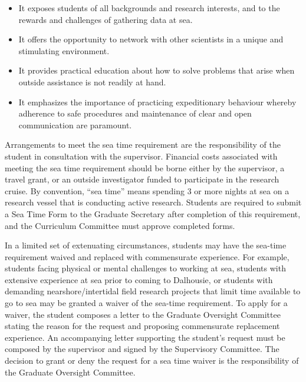 \documentclass[12pt]{article}
\newcommand{\di}[1]{#1}
\newcommand{\parnum}{\arabic{parcount}}
\newcounter{parcount}
\newcommand\p{\stepcounter{parcount}\leavevmode{\raisebox{0.2ex}{\scriptsize[\parnum]}}\hspace{0.2em}}
\newcommand{\supervisor}{supervisor\xspace}
\newcommand{\curcom}{Curriculum Committee\xspace}
\newcommand{\supcom}{Supervisory Committee\xspace}
\newcommand{\gocom}{Graduate Oversight Committee\xspace}
\newcommand{\GS}{Graduate Secretary\xspace}
\newcommand{\formST}{Sea Time Form\xspace}
\begin{document}
\begin{itemize}

    \item It exposes students of all backgrounds and research interests,
        and to the rewards and challenges of gathering data at sea.

    \item It offers the opportunity to network with other scientists in a
        unique and stimulating environment.

    \item It provides practical education about how to solve problems that
        arise when outside assistance is not readily at hand.

    \item It emphasizes the importance of practicing expeditionary behaviour
        whereby adherence to safe procedures and maintenance of clear and open
        communication are paramount.

\end{itemize}

\p Arrangements to meet the \di{sea time} requirement are the responsibility of
the student in consultation with the \supervisor. Financial costs associated
with meeting the \di{sea time} requirement should be borne either by the
supervisor, a travel grant, or an outside investigator funded to participate in
the research cruise. By convention, ``sea time'' means spending 3 or more
nights at sea on a research vessel that is conducting active research. Students
are required to submit a \formST to the \GS after completion of this
requirement, and the \curcom must approve completed forms.

\p In a limited set of extenuating circumstances, students may have the
sea-time requirement waived and replaced with commensurate experience. For
example, students facing physical or mental challenges to working at sea,
students with extensive experience at sea prior to coming to Dalhousie, or
students with demanding nearshore/intertidal field research projects that limit
time available to go to sea may be granted a waiver of the sea-time
requirement. To apply for a waiver, the student composes a letter to the
\gocom stating the reason for the request and proposing commensurate
replacement experience. An accompanying letter supporting the student's request
must be composed by the \supervisor and signed by the \supcom. The
decision to grant or deny the request for a sea time waiver is the
responsibility of the \gocom.
\end{document}
